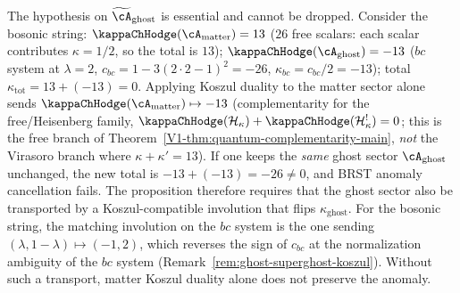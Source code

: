 \begin{remark}
\label{rem:koszul-brst-scoping}
The hypothesis on $\widetilde{\cA}_{\mathrm{ghost}}$ is essential and
cannot be dropped. Consider the bosonic string:
$\kappaChHodge(\cA_{\mathrm{matter}}) = 13$ ($26$ free scalars: each scalar
contributes $\kappa = 1/2$, so the total is $13$);
$\kappaChHodge(\cA_{\mathrm{ghost}}) = -13$ ($bc$ system at $\lambda = 2$,
$c_{bc} = 1 - 3(2{\cdot}2{-}1)^2 = -26$, $\kappa_{bc} = c_{bc}/2 = -13$);
total $\kappa_{\mathrm{tot}} = 13 + (-13) = 0$.
Applying Koszul duality to the matter sector alone sends
$\kappaChHodge(\cA_{\mathrm{matter}}) \mapsto -13$
\textup{(}complementarity for the free\slash Heisenberg family,
$\kappaChHodge(\mathcal{H}_\kappa) + \kappaChHodge(\mathcal{H}_\kappa^!) = 0$;
this is the free branch of
Theorem~\textup{\ref{V1-thm:quantum-complementarity-main}}, \emph{not}
the Virasoro branch where $\kappa + \kappa' = 13$\textup{)}.
If one keeps the \emph{same} ghost sector $\cA_{\mathrm{ghost}}$
unchanged, the new total is $-13 + (-13) = -26 \neq 0$, and BRST
anomaly cancellation fails. The proposition therefore requires that
the ghost sector also be transported by a Koszul-compatible involution
that flips $\kappa_{\mathrm{ghost}}$. For the bosonic string, the
matching involution on the $bc$ system is the one sending
$(\lambda, 1 - \lambda) \mapsto (-1, 2)$, which reverses the sign of
$c_{bc}$ at the normalization ambiguity of the $bc$ system
\textup{(}Remark~\textup{\ref{rem:ghost-superghost-koszul})}.
Without such a transport, matter Koszul duality alone does not
preserve the anomaly.
\end{remark}


